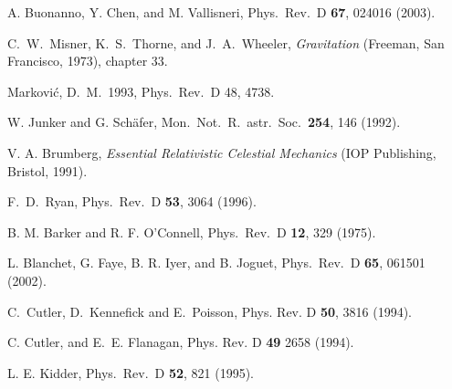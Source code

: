     A. Buonanno, Y. Chen, and M. Vallisneri, Phys.\ Rev.\ D {\bf 67},  024016 (2003).

    C.\ W.\ Misner, K.\ S.\ Thorne, and J.\ A.\ Wheeler, {\it
    Gravitation} (Freeman, San Francisco, 1973), chapter 33.

    Markovi\'c, D.\ M.\ 1993, Phys.\ Rev.\ D 48, 4738.

    W. Junker and G. Sch\"afer, Mon.\ Not.\ R.\ astr.\ Soc.\
    {\bf 254}, 146 (1992).

    V. A. Brumberg, {\it Essential Relativistic Celestial Mechanics}
(IOP Publishing, Bristol, 1991).

    F.\ D.\ Ryan, Phys.\ Rev.\ D {\bf 53}, 3064 (1996).

    B. M. Barker and R. F. O'Connell, Phys.\ Rev.\ D {\bf 12}, 329 (1975).

 L. Blanchet, G. Faye, B. R. Iyer, and B. Joguet,
Phys.\ Rev.\ D {\bf 65}, 061501 (2002).
 
C.\ Cutler, D.\ Kennefick and E.\ Poisson, Phys. Rev. D
{\bf 50}, 3816 (1994).

 C. Cutler, and E.~E. Flanagan, Phys. Rev. D {\bf 49}  2658 (1994).




    L. E. Kidder, Phys.\ Rev.\ D {\bf 52}, 821 (1995).
